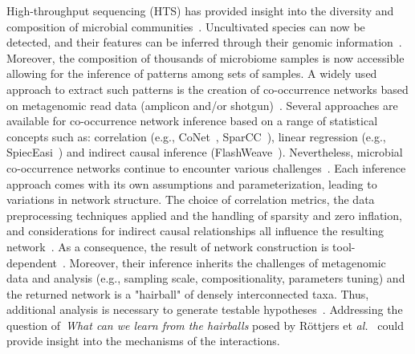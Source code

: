 \documentclass[sn-mathphys,Numbered]{sn-jnl}  %
\theoremstyle{thmstyleone}%
\theoremstyle{thmstyletwo}%
\theoremstyle{thmstylethree}%
\begin{document}
    High-throughput sequencing (HTS) has provided insight into the diversity and composition of microbial communities~\cite{elixir_microbiome}. %
    Uncultivated species can now be detected, and their features can be inferred through their genomic information~\cite{hug2016new}.
    Moreover, the composition of thousands of microbiome samples is now accessible allowing for the inference of patterns among sets of samples.
    A widely used approach to extract such patterns is the creation of co-occurrence networks based on metagenomic read data (amplicon and/or shotgun)~\cite{matchado2021network}. 
    Several approaches are available for co-occurrence network inference based on a range of statistical concepts such as: correlation (e.g., CoNet~\cite{faust2012microbial}, SparCC~\cite{friedman2012inferring}), linear regression (e.g., SpiecEasi~\cite{kurtz2015sparse}) and indirect causal inference (FlashWeave~\cite{flashweave_cite}).
    Nevertheless, microbial co-occurrence networks continue to encounter various challenges~\cite{faust2021open, cao2017inferring}.
    Each inference approach comes with its own assumptions and parameterization, leading to variations in network structure. 
    The choice of correlation metrics, the data preprocessing techniques applied and the handling of sparsity and zero inflation, and considerations for indirect causal relationships all influence the resulting network~\cite{cao2017inferring}. 
    As a consequence, the result of network construction is tool-dependent~\cite{kishore2023inferring, weiss2016correlation}.
    Moreover, their inference inherits the challenges of metagenomic data and analysis (e.g., sampling scale, compositionality, parameters tuning) and the returned network is a "hairball" of densely interconnected taxa.
    Thus, additional analysis is necessary to generate testable hypotheses~\cite{faust2021open}.
    Addressing the question of~\textit{What can we learn from the hairballs} posed by R{\"o}ttjers et \textit{al.}~\cite{rottjers2018hairballs} could provide insight into the mechanisms of the interactions.
\end{document}
